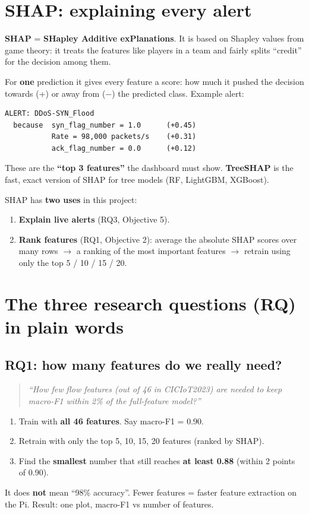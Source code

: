 \documentclass[11pt]{article}
\newcommand{\q}[1]{\begin{quote}\itshape ``#1''\end{quote}}
\begin{document}
\section{SHAP: explaining every alert}

\textbf{SHAP} = \textbf{SHapley Additive exPlanations}. It is based on Shapley values from game theory: it treats the features like players in a team
and fairly splits ``credit'' for the decision among them.

For \textbf{one} prediction it gives every feature a score: how much it pushed the decision towards (+) or away from ($-$) the predicted class. Example alert:
\begin{verbatim}
ALERT: DDoS-SYN_Flood
  because  syn_flag_number = 1.0      (+0.45)
           Rate = 98,000 packets/s    (+0.31)
           ack_flag_number = 0.0      (+0.12)
\end{verbatim}
These are the \textbf{``top 3 features''} the dashboard must show.
\textbf{TreeSHAP} is the fast, exact version of SHAP for tree models (RF, LightGBM, XGBoost).

SHAP has \textbf{two uses} in this project:
\begin{enumerate}
\item \textbf{Explain live alerts} (RQ3, Objective 5).
\item \textbf{Rank features} (RQ1, Objective 2): average the absolute SHAP scores over many rows $\rightarrow$ a ranking of the most important features
$\rightarrow$ retrain using only the top 5 / 10 / 15 / 20.
\end{enumerate}

\newpage
\section{The three research questions (RQ) in plain words}

\subsection*{RQ1: how many features do we really need?}
\q{How few flow features (out of 46 in CICIoT2023) are needed to keep macro-F1 within 2\% of the full-feature model?}
\begin{enumerate}
\item Train with \textbf{all 46 features}. Say macro-F1 = 0.90.
\item Retrain with only the top 5, 10, 15, 20 features (ranked by SHAP).
\item Find the \textbf{smallest} number that still reaches \textbf{at least 0.88} (within 2 points of 0.90).
\end{enumerate}
It does \textbf{not} mean ``98\% accuracy''. Fewer features = faster feature extraction on the Pi.
Result: one plot, macro-F1 vs number of features.
\end{document}
